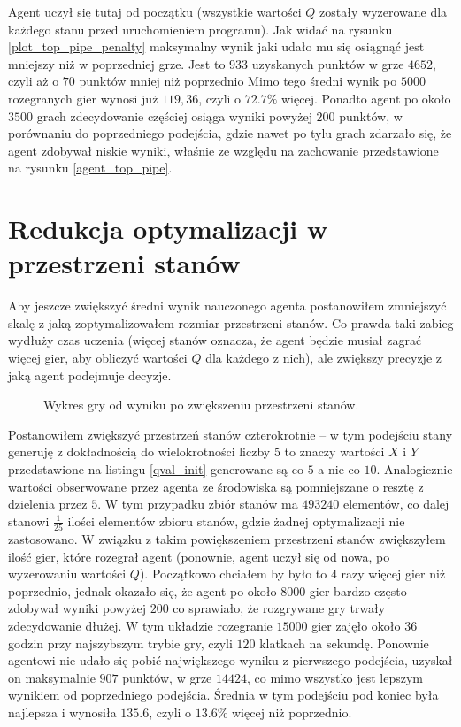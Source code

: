 \documentclass[a4paper, 12pt,twoside]{report}
\begin{document}
Agent uczył się tutaj od początku (wszystkie wartości $Q$ zostały wyzerowane
dla każdego stanu przed uruchomieniem programu).
Jak widać na rysunku \ref{plot_top_pipe_penalty} maksymalny wynik jaki 
udało mu się osiągnąć jest mniejszy niż w poprzedniej grze. Jest to $933$
uzyskanych punktów w grze $4652$, czyli aż o $70$ punktów mniej niż poprzednio
Mimo tego średni wynik po $5000$ rozegranych gier wynosi już $119,36$, czyli o 
$72.7\%$ więcej. Ponadto agent po około
$3500$ grach zdecydowanie częściej osiąga wyniki powyżej $200$ punktów, w
porównaniu do poprzedniego podejścia, gdzie nawet po tylu grach zdarzało się,
że agent zdobywał niskie wyniki, właśnie ze względu na zachowanie przedstawione
na rysunku \ref{agent_top_pipe}.

\section{Redukcja optymalizacji w przestrzeni stanów}
Aby jeszcze zwiększyć średni wynik nauczonego agenta postanowiłem zmniejszyć
skalę z jaką zoptymalizowałem rozmiar przestrzeni stanów. Co prawda taki zabieg
wydłuży czas uczenia (więcej stanów oznacza, że agent będzie musiał zagrać
więcej gier, aby obliczyć wartości $Q$ dla każdego z nich), ale zwiększy
precyzje z jaką agent podejmuje decyzje.
\begin{figure}[!htb]
	\begin{center}
		
	\end{center}
	\caption{Wykres gry od wyniku po zwiększeniu przestrzeni stanów.}
	\label{plot_gird_5x5}
\end{figure}

Postanowiłem zwiększyć przestrzeń stanów czterokrotnie -- w tym podejściu stany
generuję z dokładnością do wielokrotności liczby $5$ to znaczy wartości $X$ i
$Y$ przedstawione na listingu \ref{qval_init} generowane są co $5$ a nie co
$10$. Analogicznie wartości obserwowane przez agenta ze środowiska są
pomniejszane o resztę z dzielenia przez $5$. W tym przypadku zbiór stanów ma
$493 240$ elementów, co dalej stanowi $\frac{1}{25}$ ilości elementów
zbioru stanów, gdzie żadnej optymalizacji nie zastosowano. W związku z takim
powiększeniem przestrzeni stanów zwiększyłem ilość gier, które rozegrał agent
(ponownie, agent uczył się od nowa, po wyzerowaniu wartości $Q$). Początkowo
chciałem by było to $4$ razy więcej gier niż poprzednio, jednak okazało się,
że agent po około $8000$ gier bardzo często zdobywał wyniki powyżej $200$ co
sprawiało, że rozgrywane gry trwały zdecydowanie dłużej. W tym układzie
rozegranie $15000$ gier zajęło około $36$ godzin przy najszybszym trybie gry,
czyli $120$ klatkach na sekundę. Ponownie agentowi nie udało się pobić
największego wyniku z pierwszego podejścia, uzyskał on maksymalnie $907$
punktów, w grze $14424$, co mimo wszystko jest lepszym wynikiem od poprzedniego
podejścia. Średnia w tym podejściu pod koniec była najlepsza i wynosiła
$135.6$, czyli o $13.6\%$ więcej niż poprzednio.
\end{document}
